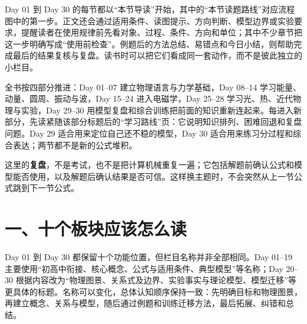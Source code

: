 Day 01 到 Day 30 的每节都以“本节导读”开始，其中的“本节读题路线”对应流程图中的第一步。正文还会通过适用条件、读图提示、方向判断、模型边界或实验要求，提醒读者在使用规律前先看对象、过程、条件、方向和单位；其中不少章节把这一步明确写成“使用前检查”。例题后的方法总结、易错点和今日小结，则帮助完成最后的结果复核与复盘。读书时可以把它们看成同一套动作，而不是彼此独立的小栏目。

\newpage

全书按四部分推进：Day 01--07 建立物理语言与力学基础，Day 08--14 学习能量、动量、圆周、振动与波，Day 15--24 进入电磁学，Day 25--28 学习光、热、近代物理与实验，Day 29--30 用模型复盘和综合训练把前面的知识重新连起来。每进入新部分，先读紧随该部分标题后的“学习路线”页：它说明知识排列、困难回退和复盘问题。Day 29 适合用来定位自己还不稳的模型，Day 30 适合用来练习分过程和综合表达；两节都不是新的公式堆积。

这里的\textbf{复盘}，不是考试，也不是把计算机械重复一遍；它包括解题前确认公式和模型能否使用，以及解题后确认结果是否可信。这样换主题时，不会突然从上一节公式跳到下一节公式。

\section*{一、十个板块应该怎么读}

Day 01 到 Day 30 都保留十个功能位置，但栏目名称并非全部相同。Day 01--19 主要使用“初高中衔接、核心概念、公式与适用条件、典型模型”等名称；Day 20--30 根据内容改为“物理图景、关系式及边界、实验事实与理论模型、模型迁移”等更具体的标题。名称可以变化，总体认知顺序保持一致：先明确目标和物理图景，再建立概念、关系与模型，随后通过例题和训练迁移方法，最后拓展、纠错和总结。

